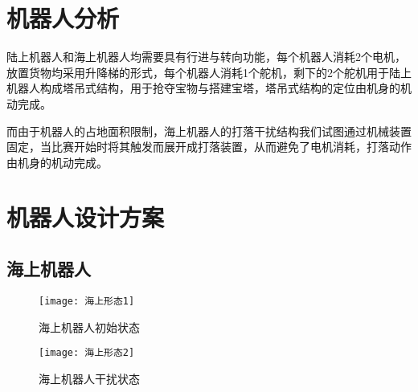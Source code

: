 \documentclass{Robot}
\begin{document}
    \section{机器人分析}

    陆上机器人和海上机器人均需要具有行进与转向功能，每个机器人消耗2个电机，放置货物均采用升降梯的形式，每个机器人消耗1个舵机，剩下的2个舵机用于陆上机器人构成塔吊式结构，用于抢夺宝物与搭建宝塔，塔吊式结构的定位由机身的机动完成。
    \par
    而由于机器人的占地面积限制，海上机器人的打落干扰结构我们试图通过机械装置固定，当比赛开始时将其触发而展开成打落装置，从而避免了电机消耗，打落动作由机身的机动完成。

    \section{机器人设计方案}
        \subsection{海上机器人}

        \begin{figure}[H]
            \centering
                \begin{minipage}[t]{0.48\textwidth}
                    \centering
                    \texttt{[image: 海上形态1]}
                    \caption{海上机器人初始状态}
                \end{minipage}
                \begin{minipage}[t]{0.48\textwidth}
                    \centering
                    \texttt{[image: 海上形态2]}
                    \caption{海上机器人干扰状态}
                \end{minipage}
            \end{figure}
            
\end{document}
